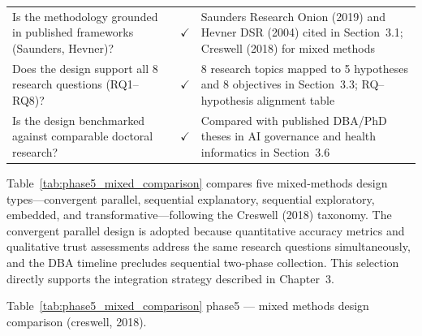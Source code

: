 \begin{xltabular}{\textwidth}{@{} p{0.35\textwidth} c p{0.45\textwidth} @{}}
\addlinespace
Is the methodology grounded in published frameworks (Saunders, Hevner)?   & $\checkmark$ & Saunders Research Onion (2019) and Hevner DSR (2004) cited in Section~3.1; Creswell (2018) for mixed methods \\
\addlinespace
Does the design support all 8 research questions (RQ1--RQ8)?             & $\checkmark$ & 8 research topics mapped to 5 hypotheses and 8 objectives in Section~3.3; RQ--hypothesis alignment table \\
\addlinespace
Is the design benchmarked against comparable doctoral research?           & $\checkmark$ & Compared with published DBA/PhD theses in AI governance and health informatics in Section~3.6 \\
\end{xltabular}
\endgroup


\vspace{1.5em}

Table~\ref{tab:phase5_mixed_comparison} compares five mixed-methods design types---convergent parallel, sequential explanatory, sequential exploratory, embedded, and transformative---following the Creswell (2018) taxonomy. The convergent parallel design is adopted because quantitative accuracy metrics and qualitative trust assessments address the same research questions simultaneously, and the DBA timeline precludes sequential two-phase collection. This selection directly supports the integration strategy described in Chapter~3.

\begingroup\singlespacing\tablefontsize\tablestripes
\noindent Table~\ref{tab:phase5_mixed_comparison} phase5 --- mixed methods design comparison (creswell, 2018).

